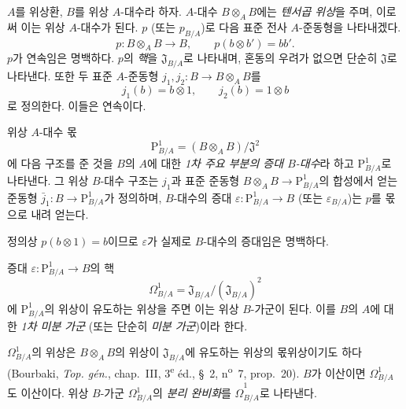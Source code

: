 \begin{env}[20.4.1]
\label{0.20.4.1-ko}
$A$를 위상환, $B$를 위상 $A$-대수라 하자. $A$-대수
$B\otimes_A B$에는 \emph{텐서곱 위상}을 주며, 이로써 이는 위상
$A$-대수가 된다. $p$ (또는 $p_{B/A}$)로 다음 표준 전사
$A$-준동형을 나타내겠다.
\begin{equation}
\tag{20.4.1.1}
\label{0.20.4.1.1-ko}
  p:B\otimes_A B\to B,
  \qquad p(b\otimes b')=bb'.
\end{equation}
$p$가 연속임은 명백하다. $p$의 \emph{핵}을
$\mathfrak J_{B/A}$로 나타내며, 혼동의 우려가 없으면 단순히
$\mathfrak J$로 나타낸다. 또한 두 표준 $A$-준동형
$j_1,j_2:B\to B\otimes_A B$를
\[
  j_1(b)=b\otimes1,\qquad j_2(b)=1\otimes b
\]
로 정의한다. 이들은 연속이다.
\end{env}

\begin{definition}[20.4.2]
\label{0.20.4.2-ko}
위상 $A$-대수 몫
\begin{equation}
\tag{20.4.2.1}
\label{0.20.4.2.1-ko}
  \mathrm P^1_{B/A}=(B\otimes_A B)/\mathfrak J^2
\end{equation}
에 다음 구조를 준 것을 $B$의 $A$에 대한 \emph{1차 주요 부분의
증대 $B$-대수}라 하고 $\mathrm P^1_{B/A}$로 나타낸다. 그 위상
$B$-대수 구조는 $j_1$과 표준 준동형
$B\otimes_A B\to\mathrm P^1_{B/A}$의 합성에서 얻는 준동형
$\bar j_1:B\to\mathrm P^1_{B/A}$가 정의하며, $B$-대수의 증대
$\varepsilon:\mathrm P^1_{B/A}\to B$ (또는 $\varepsilon_{B/A}$)는
$p$를 몫으로 내려 얻는다.

정의상 $p(b\otimes1)=b$이므로 $\varepsilon$가 실제로 $B$-대수의
증대임은 명백하다.
\end{definition}

\begin{definition}[20.4.3]
\label{0.20.4.3-ko}
증대 $\varepsilon:\mathrm P^1_{B/A}\to B$의 핵
\begin{equation}
\tag{20.4.3.1}
\label{0.20.4.3.1-ko}
  \Omega^1_{B/A}=\mathfrak J_{B/A}/(\mathfrak J_{B/A})^2
\end{equation}
에 $\mathrm P^1_{B/A}$의 위상이 유도하는 위상을 주면 이는 위상
$B$-가군이 된다. 이를 $B$의 $A$에 대한 \emph{1차 미분 가군}
(또는 단순히 \emph{미분 가군})이라 한다.
\end{definition}

$\Omega^1_{B/A}$의 위상은 $B\otimes_A B$의 위상이
$\mathfrak J_{B/A}$에 유도하는 위상의 몫위상이기도 하다 (Bourbaki,
\emph{Top. gén.}, chap.~III, 3\textsuperscript{e} éd., §~2,
n\textsuperscript{o}~7, prop.~20). $B$가 이산이면
$\Omega^1_{B/A}$도 이산이다. 위상 $B$-가군 $\Omega^1_{B/A}$의
\emph{분리 완비화}를 $\widehat{\Omega}^1_{B/A}$로 나타낸다.

